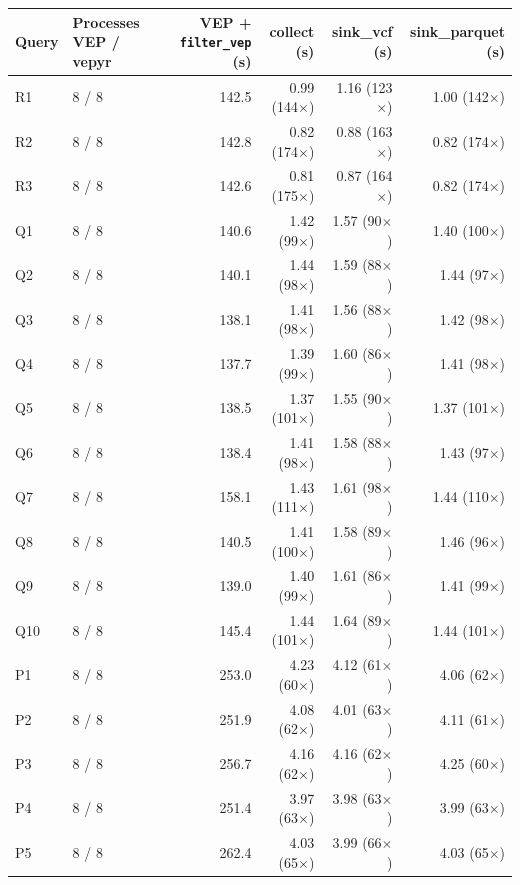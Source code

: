 \begin{tabular}{llrrrr}
\toprule
Query & Processes VEP / vepyr & VEP + \texttt{filter\_vep} (s) & collect (s) & sink\_vcf (s) & sink\_parquet (s) \\
\midrule
R1 & 8 / 8 & 142.5 & 0.99 (144$\times$) & 1.16 (123$\times$) & 1.00 (142$\times$) \\
R2 & 8 / 8 & 142.8 & 0.82 (174$\times$) & 0.88 (163$\times$) & 0.82 (174$\times$) \\
R3 & 8 / 8 & 142.6 & 0.81 (175$\times$) & 0.87 (164$\times$) & 0.82 (174$\times$) \\
Q1 & 8 / 8 & 140.6 & 1.42 (99$\times$) & 1.57 (90$\times$) & 1.40 (100$\times$) \\
Q2 & 8 / 8 & 140.1 & 1.44 (98$\times$) & 1.59 (88$\times$) & 1.44 (97$\times$) \\
Q3 & 8 / 8 & 138.1 & 1.41 (98$\times$) & 1.56 (88$\times$) & 1.42 (98$\times$) \\
Q4 & 8 / 8 & 137.7 & 1.39 (99$\times$) & 1.60 (86$\times$) & 1.41 (98$\times$) \\
Q5 & 8 / 8 & 138.5 & 1.37 (101$\times$) & 1.55 (90$\times$) & 1.37 (101$\times$) \\
Q6 & 8 / 8 & 138.4 & 1.41 (98$\times$) & 1.58 (88$\times$) & 1.43 (97$\times$) \\
Q7 & 8 / 8 & 158.1 & 1.43 (111$\times$) & 1.61 (98$\times$) & 1.44 (110$\times$) \\
Q8 & 8 / 8 & 140.5 & 1.41 (100$\times$) & 1.58 (89$\times$) & 1.46 (96$\times$) \\
Q9 & 8 / 8 & 139.0 & 1.40 (99$\times$) & 1.61 (86$\times$) & 1.41 (99$\times$) \\
Q10 & 8 / 8 & 145.4 & 1.44 (101$\times$) & 1.64 (89$\times$) & 1.44 (101$\times$) \\
P1 & 8 / 8 & 253.0 & 4.23 (60$\times$) & 4.12 (61$\times$) & 4.06 (62$\times$) \\
P2 & 8 / 8 & 251.9 & 4.08 (62$\times$) & 4.01 (63$\times$) & 4.11 (61$\times$) \\
P3 & 8 / 8 & 256.7 & 4.16 (62$\times$) & 4.16 (62$\times$) & 4.25 (60$\times$) \\
P4 & 8 / 8 & 251.4 & 3.97 (63$\times$) & 3.98 (63$\times$) & 3.99 (63$\times$) \\
P5 & 8 / 8 & 262.4 & 4.03 (65$\times$) & 3.99 (66$\times$) & 4.03 (65$\times$) \\
\bottomrule
\end{tabular}
